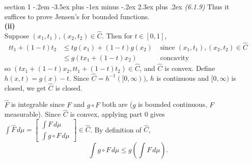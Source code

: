 \documentclass[12pt]{article}
\makeatletter
\theoremstyle{norm}
\newcommand{\pa}[1]{\left( {#1} \right)}
\newcommand{\subprob}[1]{\noindent\textbf{#1}\\}
\newcommand{\iy}[0]{\infty}
\newcommand{\coltwo}[2]{
\left[
\begin{matrix}
{#1}\\
{#2} 
\end{matrix}
\right]}
\newenvironment{problem}{\@startsection
       {section}
       {1}
       {-.2em}
       {-3.5ex plus -1ex minus -.2ex}
       {2.3ex plus .2ex}
       {\pagebreak[3]%
       \large\bf\noindent{Problem }
       }
       }
       {%
       }
\makeatother
\begin{document}
\begin{problem}{\it(6.1.9)}
Thus it suffices to prove Jensen's for bounded functions.\\

\subprob{(ii)}
Suppose $(x_1,t_1),(x_2,t_2)\in \hat{C}$. Then for $t\in [0,1]$,
\begin{align*}
tt_1+(1-t)t_2&\le tg(x_1)+(1-t)g(x_2)&\text{ since }(x_1,t_1),(x_2,t_2)\in \hat{C}\\
&\le g(tx_1+(1-t)x_2)&\text{ concavity}
\end{align*}
so $(tx_1+(1-t)x_2,tt_1+(1-t)t_2)\in \hat{C}$, and $\hat C$ is convex. Define $h(x,t)=g(x)-t$. Since $\hat C=h^{-1}([0,\iy))$, $h$ is continuous and $[0,\iy)$ is closed, we get $\hat C$ is closed.

$\hat{F}$ is integrable since $F$ and $g\circ F$ both are ($g$ is bounded continuous, $F$ measurable). Since $\hat C$ is convex, applying part 0 gives $\int \hat F\,d\mu=\coltwo{\int F\,d\mu}{\int g\circ F\,d\mu}\in \hat C$. By definition of $\hat C$,
\[
\int g\circ F\,d\mu\le g\pa{\int F\,d\mu}.
\]
\end{problem}
\end{document}
